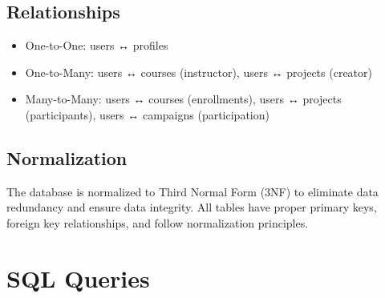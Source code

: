 \documentclass[12pt]{report}
\begin{document}
    \section{Relationships}
    \begin{itemize}
        \item One-to-One: users ↔ profiles
        \item One-to-Many: users ↔ courses (instructor), users ↔ projects (creator)
        \item Many-to-Many: users ↔ courses (enrollments), users ↔ projects (participants), users ↔ campaigns (participation)
    \end{itemize}
    
    \section{Normalization}
    The database is normalized to Third Normal Form (3NF) to eliminate data redundancy and ensure data integrity. All tables have proper primary keys, foreign key relationships, and follow normalization principles.
    
    \chapter{SQL Queries}
    
\end{document}
